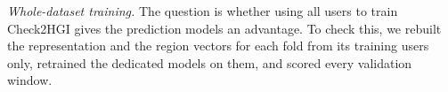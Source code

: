 \emph{Whole-dataset training.} The question is whether using all users to train
Check2HGI gives the prediction models an advantage. To check this, we rebuilt the
representation and the region vectors for each fold from its training users only, retrained
the dedicated models on them, and scored every validation window.
